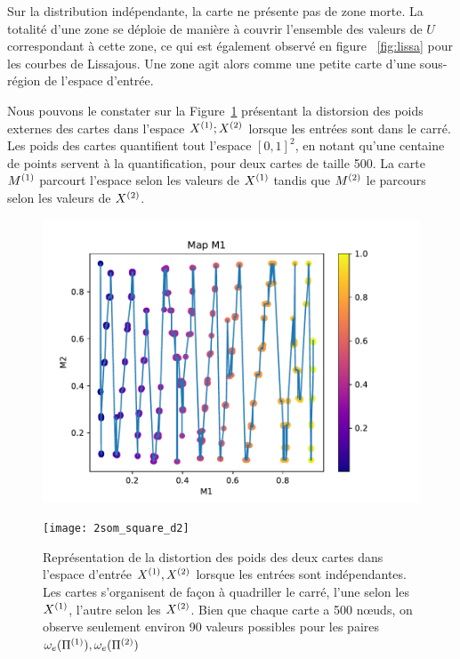 \documentclass[../main]{subfiles}
\begin{document}
Sur la distribution indépendante, la carte ne présente pas de zone morte. La totalité d'une zone se déploie de manière à couvrir l'ensemble des valeurs de $U$ correspondant à cette zone, ce qui est également observé en figure ~\ref{fig:lissa} pour les courbes de Lissajous. Une zone agit alors comme une petite carte d'une sous-région de l'espace d'entrée. 

Nous pouvons le constater sur la Figure~\ref{fig:2som_p_d} présentant la distorsion des poids externes des cartes dans l'espace $X^{({1})}; X^{({2})}$ lorsque les entrées sont dans le carré. Les poids des cartes quantifient tout l'espace $[0,1]^2$, en notant qu'une centaine de points servent à la quantification, pour deux cartes de taille 500. La carte $M^{({1})}$ parcourt l'espace selon les valeurs de $X^{({1})}$ tandis que $M^{({2})}$ le parcours selon les valeurs de $X^{({2})}$.

\begin{figure}[h!]
	\begin{minipage}{0.48\textwidth}
		\includegraphics[width=\textwidth]{2som_square_d}
	\end{minipage}
	\begin{minipage}{0.48\textwidth}
		\texttt{[image: 2som\_square\_d2]}
	\end{minipage}
	\caption{Représentation de la distortion des poids des deux cartes dans l'espace d'entrée $X^{({1})}, X^{({2})}$ lorsque les entrées sont indépendantes. Les cartes s'organisent de façon à quadriller le carré, l'une selon les $X^{({1})}$, l'autre selon les $X^{({2})}$. Bien que chaque carte a 500 n\oe{}uds, on observe seulement environ 90 valeurs possibles pour les paires $\omega_e(\Pi^{({1})}),\omega_e(\Pi^{({2})})$ \label{fig:2som_p_d}}
\end{figure}
\end{document}
